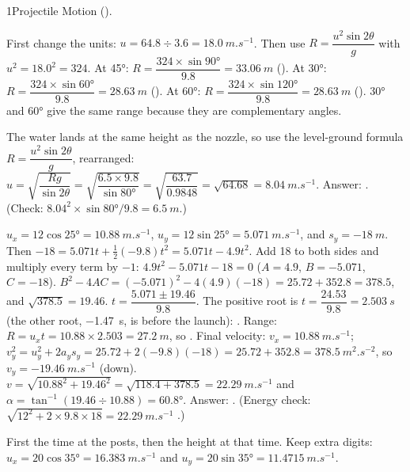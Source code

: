 \begin{chapteranswers}{1}{Projectile Motion}
        ().
  \item First change the units: $u = 64.8 \div 3.6 = \qty{18.0}{m.s^{-1}}$.
        Then use $R = \dfrac{u^2\sin 2\theta}{g}$ with $u^2 = 18.0^2 = 324$.
        At \ang{45}: $R = \dfrac{324 \times \sin\ang{90}}{9.8} = \qty{33.06}{m}$ ().
        At \ang{30}: $R = \dfrac{324 \times \sin\ang{60}}{9.8} = \qty{28.63}{m}$ ().
        At \ang{60}: $R = \dfrac{324 \times \sin\ang{120}}{9.8} = \qty{28.63}{m}$
        (). \ang{30} and \ang{60} give the same range because they are
        complementary angles.
  \item The water lands at the same height as the nozzle, so use the level-ground formula
        $R = \dfrac{u^2\sin 2\theta}{g}$, rearranged:
        $u = \sqrt{\dfrac{Rg}{\sin 2\theta}} = \sqrt{\dfrac{6.5 \times 9.8}{\sin\ang{80}}}
        = \sqrt{\dfrac{63.7}{0.9848}} = \sqrt{64.68} = \qty{8.04}{m.s^{-1}}$.
        Answer: . (Check:
        $8.04^2 \times \sin\ang{80}/9.8 = \qty{6.5}{m}$.)
  \item $u_x = 12\cos\ang{25} = \qty{10.88}{m.s^{-1}}$, $u_y = 12\sin\ang{25} = \qty{5.071}{m.s^{-1}}$,
        and $s_y = \qty{-18}{m}$. Then $-18 = 5.071t + \frac{1}{2}(-9.8)t^2 = 5.071t - 4.9t^2$. Add 18 to both sides and
        multiply every term by $-1$: $4.9t^2 - 5.071t - 18 = 0$
        ($A = 4.9$, $B = -5.071$, $C = -18$).
        $B^2 - 4AC = (-5.071)^2 - 4(4.9)(-18) = 25.72 + 352.8 = 378.5$, and $\sqrt{378.5} = 19.46$.
        $t = \dfrac{5.071 \pm 19.46}{9.8}$. The positive root is $t = \dfrac{24.53}{9.8} = \qty{2.503}{s}$
        (the other root, \qty{-1.47}{s}, is before the launch): .
        Range: $R = u_x t = 10.88 \times 2.503 = \qty{27.2}{m}$, so .
        Final velocity: $v_x = \qty{10.88}{m.s^{-1}}$;
        $v_y^2 = u_y^2 + 2a_y s_y = 25.72 + 2(-9.8)(-18) = 25.72 + 352.8 = \qty{378.5}{m^2.s^{-2}}$,
        so $v_y = \qty{-19.46}{m.s^{-1}}$ (down). $v = \sqrt{10.88^2 + 19.46^2} = \sqrt{118.4 + 378.5}
        = \qty{22.29}{m.s^{-1}}$ and $\alpha = \tan^{-1}(19.46 \div 10.88) = \ang{60.8}$.
        Answer: .
        (Energy check: $\sqrt{12^2 + 2 \times 9.8 \times 18} = \qty{22.29}{m.s^{-1}}$ \cmark.)
  \item First the time at the posts, then the height at that time. Keep extra digits:
        $u_x = 20\cos\ang{35} = \qty{16.383}{m.s^{-1}}$ and $u_y = 20\sin\ang{35} = \qty{11.4715}{m.s^{-1}}$.

\end{chapteranswers}
